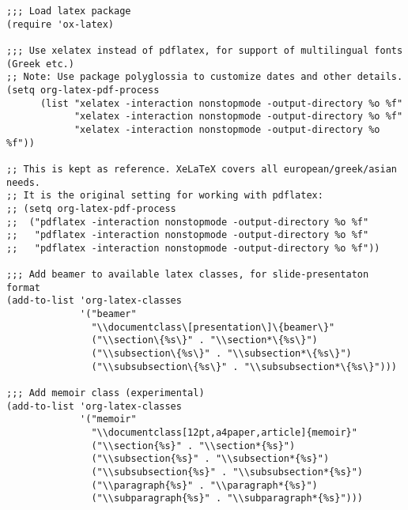 \documentclass{article}
\begin{document}
\begin{verbatim}
;;; Load latex package
(require 'ox-latex)

;;; Use xelatex instead of pdflatex, for support of multilingual fonts (Greek etc.)
;; Note: Use package polyglossia to customize dates and other details.
(setq org-latex-pdf-process
      (list "xelatex -interaction nonstopmode -output-directory %o %f"
            "xelatex -interaction nonstopmode -output-directory %o %f"
            "xelatex -interaction nonstopmode -output-directory %o %f"))

;; This is kept as reference. XeLaTeX covers all european/greek/asian needs.
;; It is the original setting for working with pdflatex:
;; (setq org-latex-pdf-process
;;  ("pdflatex -interaction nonstopmode -output-directory %o %f"
;;   "pdflatex -interaction nonstopmode -output-directory %o %f"
;;   "pdflatex -interaction nonstopmode -output-directory %o %f"))

;;; Add beamer to available latex classes, for slide-presentaton format
(add-to-list 'org-latex-classes
             '("beamer"
               "\\documentclass\[presentation\]\{beamer\}"
               ("\\section\{%s\}" . "\\section*\{%s\}")
               ("\\subsection\{%s\}" . "\\subsection*\{%s\}")
               ("\\subsubsection\{%s\}" . "\\subsubsection*\{%s\}")))

;;; Add memoir class (experimental)
(add-to-list 'org-latex-classes
             '("memoir"
               "\\documentclass[12pt,a4paper,article]{memoir}"
               ("\\section{%s}" . "\\section*{%s}")
               ("\\subsection{%s}" . "\\subsection*{%s}")
               ("\\subsubsection{%s}" . "\\subsubsection*{%s}")
               ("\\paragraph{%s}" . "\\paragraph*{%s}")
               ("\\subparagraph{%s}" . "\\subparagraph*{%s}")))


\end{verbatim}
\end{document}
